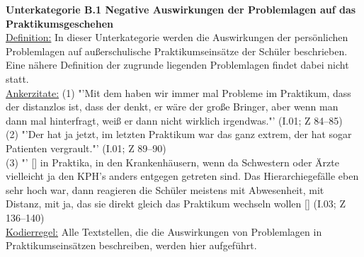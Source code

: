 \textbf{Unterkategorie B.1 Negative Auswirkungen der Problemlagen auf das Praktikumsgeschehen}\\
\underline{Definition:} In dieser Unterkategorie werden die Auswirkungen der persönlichen Problemlagen auf außerschulische Praktikumseinsätze der Schüler beschrieben. Eine nähere Definition der zugrunde liegenden Problemlagen findet dabei nicht statt.\\
\underline{Ankerzitate:} (1) "'Mit dem haben wir immer mal Probleme im Praktikum, dass der distanzlos ist, dass der denkt, er wäre der große Bringer, aber wenn man dann mal hinterfragt, weiß er dann nicht wirklich irgendwas."' (I.01; Z 84--85)\\ (2) "'Der hat ja jetzt, im letzten Praktikum war das ganz extrem, der hat sogar Patienten vergrault."' (I.01; Z 89--90)\\ (3) "' [\punkte] in Praktika, in den Krankenhäusern, wenn da Schwestern oder Ärzte vielleicht ja den KPH's anders entgegen getreten sind. Das Hierarchiegefälle eben sehr hoch war, dann reagieren die Schüler meistens mit Abwesenheit, mit Distanz, mit ja, das sie direkt gleich das Praktikum wechseln wollen [\punkte] (I.03; Z 136--140)\\
\underline{Kodierregel:} Alle Textstellen, die die Auswirkungen von Problemlagen in Praktikumseinsätzen beschreiben, werden hier aufgeführt.\\

